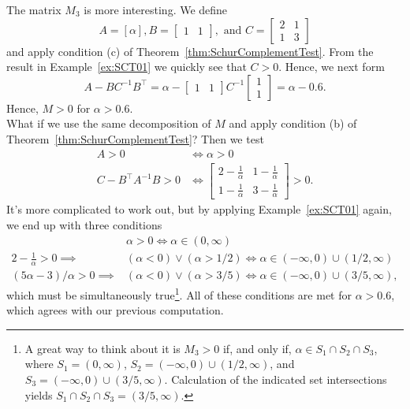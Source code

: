 The matrix $M_3$ is more interesting. We define
$$A = [\alpha], B = \left[ \begin{array}{rr} 1 & 1\end{array} \right] , \text{ and } C = \left[ \begin{array}{rr} 2 & 1\\ 1 & 3\end{array} \right]$$
and apply condition (c) of Theorem~\ref{thm:SchurComplementTest}. From the result in Example~\ref{ex:SCT01} we quickly see that $C >0$. Hence, we next form 
$$A - B C ^{-1} B^\top = \alpha -\left[ \begin{array}{rr} 1 & 1\end{array} \right] C^{-1} \left[ \begin{array}{r} 1 \\ 1\end{array} \right] = \alpha - 0.6. $$
Hence, $M>0$ for $\alpha > 0.6$. \\

What if we use the same decomposition of $M$ and apply condition (b) of Theorem~\ref{thm:SchurComplementTest}? Then we test 
\begin{align*}
    A > 0 & \iff \alpha > 0 \\
    C-B^\top A^{-1} B > 0 & \iff \left[ \begin{array}{rr} 2-\frac{1}{\alpha} & 1-\frac{1}{\alpha}\\ 1-\frac{1}{\alpha} & 3-\frac{1}{\alpha}\end{array} \right] > 0. 
\end{align*}
It's more complicated to work out, but by applying Example~\ref{ex:SCT01} again, we end up with three conditions
\begin{align*}
   & \alpha > 0 \iff \alpha \in (0, \infty)\\
   2-\frac{1}{\alpha} > 0  \implies& (\alpha <0) \lor(\alpha > 1/2) \iff \alpha \in (-\infty, 0) \cup (1/2, \infty)\\
   (5 \alpha -3)/\alpha >0 \implies& (\alpha <0) \lor (\alpha> 3/5) \iff \alpha \in (-\infty, 0) \cup (3/5, \infty),
\end{align*}
which must be simultaneously true\footnote{A great way to think about it is $M_3>0$ if, and only if,  $\alpha \in S_1 \cap S_2 \cap S_3$, where $S_1=(0, \infty)$, $S_2=(-\infty, 0) \cup (1/2, \infty)$, and $S_3=(-\infty, 0) \cup (3/5, \infty)$. Calculation of the indicated set intersections yields $ S_1 \cap S_2 \cap S_3 = (3/5, \infty).$ }. All of these conditions are met for $\alpha > 0.6$, which agrees with our previous computation.\\

